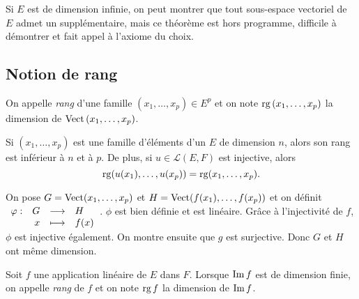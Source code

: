 \documentclass{magnolia}
\begin{document}
\begin{remarqueUnique}
\remarque Si $E$ est de dimension infinie, on peut montrer que tout sous-espace vectoriel
  de $E$ admet un supplémentaire, mais ce théorème est hors programme, difficile à
  démontrer et fait appel à l'axiome du choix.
\end{remarqueUnique}

\subsection{Notion de rang}
\begin{definition}[utile=-3]
On appelle \emph{rang} d'une famille $(x_1,\ldots,x_p)\in E^p$ et on note
$\operatorname{rg}\left(x_1,\ldots,x_p\right)$ la dimension de $\operatorname{Vect}\left(x_1,\ldots,x_p\right)$.
\end{definition}

\begin{remarqueUnique}
\remarque Si $(x_1,\ldots,x_p)$ est une famille d'éléments d'un \Kev $E$ de
  dimension $n$, alors son rang est inférieur à $n$ et à $p$. De plus,
  si $u\in\mathcal{L}(E,F)$ est injective, alors
  \[\operatorname{rg}(u(x_1),\ldots,u(x_p))=\operatorname{rg}(x_1,\ldots,x_p).\]
\end{remarqueUnique}

\begin{sol}
On pose $G=\operatorname{Vect}(x_1,\ldots,x_p)$ et $H=\operatorname{Vect}(f(x_1),\ldots,f(x_p))$ et on définit $\begin{array}[t]{lrcl} \displaystyle{\varphi} : & \displaystyle{G} & \longrightarrow & \displaystyle{H} \\ & \displaystyle{x} & \longmapsto & \displaystyle{f(x)} \end{array}$. $\phi$ est bien définie et est linéaire. Grâce à l'injectivité de $f$, $\phi$ est injective également. On montre ensuite que $g$ est surjective. Donc $G$ et $H$ ont même dimension.
\end{sol}

\begin{definition}[utile=-3]
Soit $f$ une application linéaire de $E$ dans $F$. Lorsque $\operatorname{Im} f$ est de
dimension finie, on appelle \emph{rang} de $f$ et on note $\operatorname{rg} f$ la dimension de
$\operatorname{Im} f$.
\end{definition}
\end{document}
